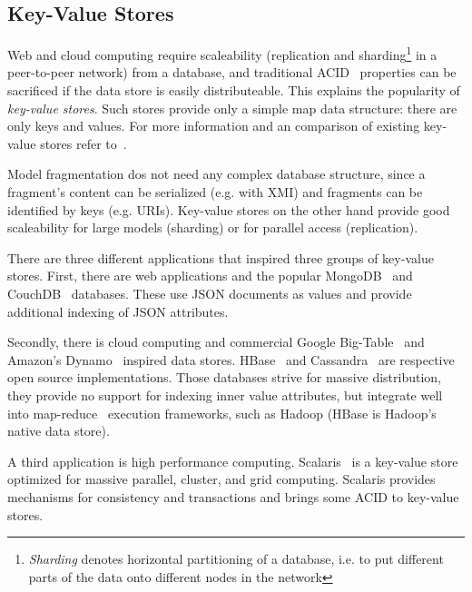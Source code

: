 \subsection{Key-Value Stores}

Web and cloud computing require scaleability (replication and sharding\footnote{\emph{Sharding} denotes horizontal partitioning of a database, i.e. to put different parts of the data onto different nodes in the network} in a peer-to-peer network) from a database, and traditional ACID~\cite{ACID} properties can be sacrificed if the data store is easily distributeable. This explains the popularity of \emph{key-value stores}. Such stores provide only a simple map data structure: there are only keys and values. For more information and an comparison of existing key-value stores refer to~\cite{nosql2010}.

Model fragmentation dos not need any complex database structure, since a fragment's content can be serialized (e.g. with XMI) and fragments can be identified by keys (e.g. URIs). Key-value stores on the other hand provide good scaleability for  large models (sharding) or for parallel access (replication).

There are three different applications that inspired three groups of key-value stores. First, there are web applications and the popular MongoDB~\cite{mongodb2010} and CouchDB~\cite{couchdb2010} databases. These use JSON documents as values and provide additional indexing of JSON attributes.

Secondly, there is cloud computing and commercial Google Big-Table~\cite{bigtable2006} and Amazon's Dynamo~\cite{dynamo2007} inspired data stores. HBase~\cite{hbase2008} and Cassandra~\cite{cassandra2009} are respective open source implementations. Those databases strive for massive distribution, they provide no support for indexing inner value attributes, but integrate well into map-reduce~\cite{mapreduce} execution frameworks, such as Hadoop (HBase is Hadoop's native data store). 

A third application is high performance computing. Scalaris~\cite{ScalarisTransactions2008} is a key-value store optimized for massive parallel, cluster, and grid computing. Scalaris provides mechanisms for consistency and transactions and brings some ACID to key-value stores.